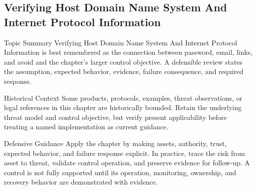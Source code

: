 \documentclass[11pt,letterpaper]{article}
\begin{document}
\subsection*{Verifying Host Domain Name System And Internet Protocol Information}
\begin{CornellNotesTable}
\end{CornellNotesTable}
\begin{CornellSummaryBox}{Topic Summary}
Verifying Host Domain Name System And Internet Protocol Information is best remembered as the connection between password, email, links, and avoid and the chapter's larger control objective. A defensible review states the assumption, expected behavior, evidence, failure consequence, and required response.
\end{CornellSummaryBox}
\begin{CornellWarningBox}{Historical Context}
Some products, protocols, examples, threat observations, or legal references in this chapter are historically bounded. Retain the underlying threat model and control objective, but verify present applicability before treating a named implementation as current guidance.
\end{CornellWarningBox}
\begin{CornellOverviewBox}{Defensive Guidance}
Apply the chapter by making assets, authority, trust, expected behavior, and failure response explicit. In practice, trace the risk from asset to threat, validate control operation, and preserve evidence for follow-up. A control is not fully supported until its operation, monitoring, ownership, and recovery behavior are demonstrated with evidence.
\end{CornellOverviewBox}
\end{document}
